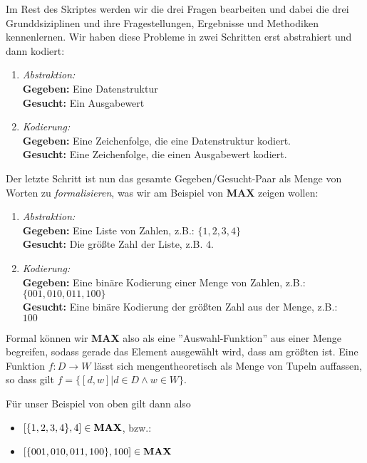 {Im Rest des Skriptes werden wir die drei Fragen bearbeiten und
dabei die drei Grunddsiziplinen und ihre Fragestellungen, Ergebnisse und Methodiken kennenlernen.
Wir haben diese Probleme in zwei Schritten erst abstrahiert und dann kodiert:
\begin{enumerate}
    \item \emph{Abstraktion:}
        \\\textbf{Gegeben:} Eine Datenstruktur
        \\\textbf{Gesucht:} Ein Ausgabewert
    \item \emph{Kodierung:}
        \\\textbf{Gegeben:} Eine Zeichenfolge, die eine Datenstruktur kodiert.
        \\\textbf{Gesucht:} Eine Zeichenfolge, die einen Ausgabewert kodiert.
\end{enumerate}
Der letzte Schritt ist nun das gesamte Gegeben/Gesucht-Paar
als Menge von Worten zu \emph{formalisieren},
was wir am Beispiel von \textbf{MAX} zeigen wollen:
\begin{enumerate}
    \item \emph{Abstraktion:}
        \\\textbf{Gegeben:} Eine Liste von Zahlen, z.B.: $\{1,2,3,4\}$
        \\\textbf{Gesucht:} Die größte Zahl der Liste, z.B. $4$.
    \item \emph{Kodierung:}
        \\\textbf{Gegeben:} Eine binäre Kodierung einer Menge von Zahlen, z.B.:
        \\$\{001, 010, 011, 100\}$
        \\\textbf{Gesucht:} Eine binäre Kodierung der größten Zahl aus der Menge, z.B.:
        \\$100$
\end{enumerate}

Formal können wir \textbf{MAX} also als eine ''Auswahl-Funktion'' aus einer Menge begreifen,
sodass gerade das Element ausgewählt wird, dass am größten ist.
Eine Funktion $f: D \rightarrow W$ lässt sich mengentheoretisch als Menge von Tupeln auffassen,
so dass gilt $f = \{[d,w]|d \in D \wedge w \in W\}$.

\noindent
Für unser Beispiel von oben gilt dann also
\begin{itemize}
    \item $[\{1,2,3,4\},4] \in \bf{MAX}$, bzw.:
    \item $[\{001, 010, 011, 100\}, 100] \in \bf{MAX}$
\end{itemize}

}
